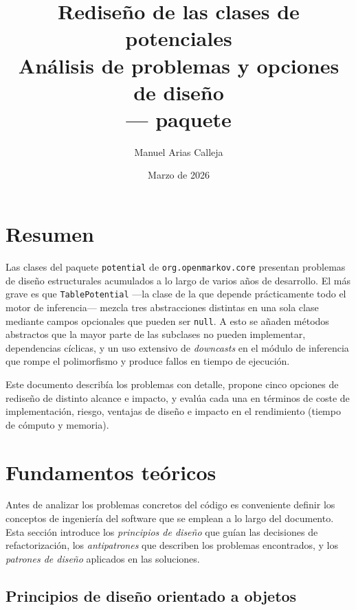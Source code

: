 \documentclass[11pt,a4paper]{article}
\title{Rediseño de las clases de potenciales\\
       \large Análisis de problemas y opciones de diseño\\[4pt]
       \normalsize \code{org.openmarkov.core} --- paquete \code{model.network.potential}}
\author{Manuel Arias Calleja}
\date{Marzo de 2026}
\newcommand{\code}[1]{\texttt{#1}}
\begin{document}
\maketitle
\tableofcontents
\newpage

\section*{Resumen}

Las clases del paquete \code{potential} de \code{org.openmarkov.core} presentan
problemas de diseño estructurales acumulados a lo largo de varios años de
desarrollo.  El más grave es que \code{TablePotential} ---la clase de la que
depende prácticamente todo el motor de inferencia--- mezcla tres abstracciones
distintas en una sola clase mediante campos opcionales que pueden ser \code{null}.
A esto se añaden métodos abstractos que la mayor parte de las subclases no
pueden implementar, dependencias cíclicas, y un uso extensivo de \emph{downcasts}
en el módulo de inferencia que rompe el polimorfismo y produce fallos en tiempo
de ejecución.

Este documento describía los problemas con detalle, propone cinco opciones
de rediseño de distinto alcance e impacto, y evalúa cada una en términos de
coste de implementación, riesgo, ventajas de diseño e impacto en el rendimiento
(tiempo de cómputo y memoria).

\section{Fundamentos teóricos}
\label{sec:fundamentos}

Antes de analizar los problemas concretos del código es conveniente definir los
conceptos de ingeniería del software que se emplean a lo largo del documento.
Esta sección introduce los \emph{principios de diseño} que guían las decisiones
de refactorización, los \emph{antipatrones} que describen los problemas
encontrados, y los \emph{patrones de diseño} aplicados en las soluciones.

\subsection{Principios de diseño orientado a objetos}
\label{sec:fund-principios}
\end{document}
